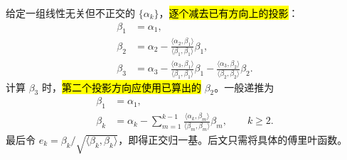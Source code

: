 给定一组线性无关但不正交的 $\{\alpha_k\}$，\hl{逐个减去已有方向上的投影}：
\begin{align*}
  \beta_1&=\alpha_1,\\
  \beta_2&=\alpha_2-
    \frac{\langle\alpha_2,\beta_1\rangle}{\langle\beta_1,\beta_1\rangle}\beta_1,\\
  \beta_3&=\alpha_3-
    \frac{\langle\alpha_3,\beta_1\rangle}{\langle\beta_1,\beta_1\rangle}\beta_1-
    \frac{\langle\alpha_3,\beta_2\rangle}{\langle\beta_2,\beta_2\rangle}\beta_2.
\end{align*}
计算 $\beta_3$ 时，\hl{第二个投影方向应使用已算出的} $\beta_2$。一般递推为
\begin{align}
  \beta_1&=\alpha_1,\\
  \beta_k&=\alpha_k-
  \sum_{m=1}^{k-1}
  \frac{\langle\alpha_k,\beta_m\rangle}
       {\langle\beta_m,\beta_m\rangle}\beta_m,
  \qquad k\geq2.
  \label{eq:gram-schmidt}
\end{align}
最后令 $e_k=\beta_k/\sqrt{\langle\beta_k,\beta_k\rangle}$，即得正交归一基。后文只需将具体的傅里叶函数。


